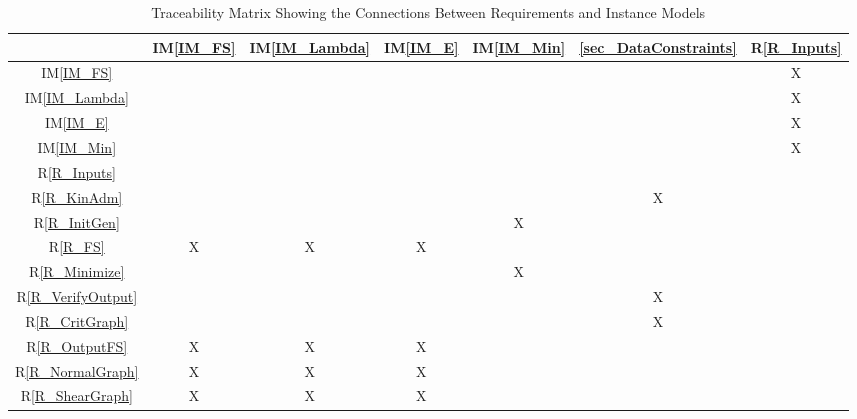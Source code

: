\documentclass[12pt]{article}
\newcommand{\tref}[1]{T\ref{#1}}
\newcommand{\iref}[1]{IM\ref{#1}}
\newcommand{\ddref}[1]{DD\ref{#1}}
\newcommand{\dref}[1]{GD\ref{#1}}
\newcommand{\rref}[1]{R\ref{#1}}
\begin{document}
\begin{table}[h!]
\centering
\begin{tabular}{|c|c|c|c|c|c|c|}
\hline
& \iref{IM_FS}& \iref{IM_Lambda}& \iref{IM_E}& \iref{IM_Min}& 
\ref{sec_DataConstraints} & \rref{R_Inputs}\\
\hline
\iref{IM_FS}          & & & & & & X\\ \hline
\iref{IM_Lambda}      & & & & & & X\\ \hline
\iref{IM_E}           & & & & & & X\\ \hline
\iref{IM_Min}         & & & & & & X\\ \hline 
\rref{R_Inputs}       & & & & & & \\ \hline
\rref{R_KinAdm}       & & & & & X& \\ \hline
\rref{R_InitGen}      & & & & X& & \\ \hline
\rref{R_FS}           & X& X& X& & & \\ \hline 
\rref{R_Minimize}     & & & & X& & \\ \hline
\rref{R_VerifyOutput} & & & & & X& \\ \hline
\rref{R_CritGraph}    & & & & & X& \\ \hline
\rref{R_OutputFS}     & X& X& X& & & \\ \hline
\rref{R_NormalGraph}  & X& X& X& & & \\ \hline
\rref{R_ShearGraph}   & X& X& X& & & \\
\hline
\end{tabular}
\caption{Traceability Matrix Showing the Connections Between Requirements and 
Instance Models}
\label{Table:R_trace}
\end{table}
%
%
%			
\end{document}
